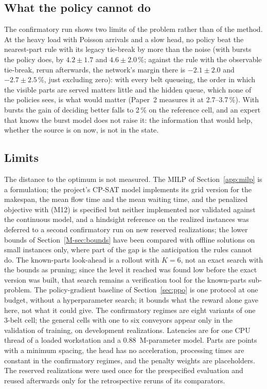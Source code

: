 \documentclass[11pt,a4paper]{article}
\theoremstyle{plain}
\theoremstyle{definition}
\theoremstyle{remark}
\begin{document}
\subsection{What the policy cannot do}
The confirmatory run shows two limits of the problem rather than of the method. At the
heavy load with Poisson arrivals and a slow head, no policy beat the nearest-part rule with
its legacy tie-break by more than the noise (with bursts the policy does, by $4.2\pm1.7$ and
$4.6\pm2.0$\,\%; against the rule with the observable tie-break, rerun afterwards, the
network's margin there is $-2.1\pm2.0$ and $-2.7\pm2.5$\,\%, just excluding zero):
with every belt queueing, the order in which the visible parts are served matters little
and the hidden queue, which none of the policies sees, is what would matter (Paper~2
measures it at 2.7--3.7\,\%). With bursts the gain of deciding better falls to 2\,\% on
the reference cell, and an expert that knows the burst model does not raise it: the
information that would help, whether the source is on now, is not in the state.

\subsection{Limits}\label{sec:limits}
The distance to the optimum is not measured. The MILP of Section~\ref{app:milp} is a
formulation; the project's CP-SAT model implements its grid version for the makespan, the
mean flow time and the mean waiting time, and the penalized objective with (M12) is
specified but neither implemented nor validated against the continuous model, and a hindsight reference on the realized
instances was deferred to a second confirmatory run on new reserved realizations; the
lower bounds of Section~\ref{M-sec:bounds} have been compared with offline solutions on
small instances only, where part of the gap is the anticipation the rules cannot do. The
known-parts look-ahead is a rollout with $K=6$, not an exact search with the bounds as
pruning; since the level it reached was found low before the exact version was built, that search
remains a verification tool for the known-parts sub-problem. The policy-gradient baseline
of Section~\ref{sec:ppo} is one protocol at one budget, without a hyperparameter
search; it bounds what the reward alone gave here, not what it could give. The confirmatory
regimes are eight variants of one 3-belt cell; the general cells with one to six
conveyors appear only in the validation of training, on development realizations.
Latencies are for one CPU thread of a loaded workstation and a 0.88~M-parameter model.
Parts are points with a minimum spacing, the head has no acceleration, processing times
are constant in the confirmatory regimes, and the penalty weights are placeholders. The
reserved realizations were used once for the prespecified evaluation and reused afterwards
only for the retrospective reruns of its comparators.
\end{document}
